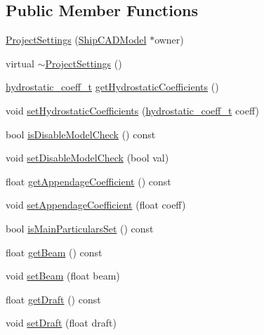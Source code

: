 \subsection*{Public Member Functions}
\begin{DoxyCompactItemize}
\item 
\hyperlink{classShipCAD_1_1ProjectSettings_a55001252531c21f4ccc89d8df9c6b184}{Project\+Settings} (\hyperlink{classShipCAD_1_1ShipCADModel}{Ship\+C\+A\+D\+Model} $\ast$owner)
\item 
virtual \hyperlink{classShipCAD_1_1ProjectSettings_a4c74ba587e58e538083072285937aa4c}{$\sim$\+Project\+Settings} ()
\item 
\hyperlink{namespaceShipCAD_a9cf77f0900561de9efc572dcbad4dbbd}{hydrostatic\+\_\+coeff\+\_\+t} \hyperlink{classShipCAD_1_1ProjectSettings_aef0458c7bfa6e484a155e78eca0d0202}{get\+Hydrostatic\+Coefficients} ()
\item 
void \hyperlink{classShipCAD_1_1ProjectSettings_ab729e778076b560d876f09955212256d}{set\+Hydrostatic\+Coefficients} (\hyperlink{namespaceShipCAD_a9cf77f0900561de9efc572dcbad4dbbd}{hydrostatic\+\_\+coeff\+\_\+t} coeff)
\item 
bool \hyperlink{classShipCAD_1_1ProjectSettings_abd8eb7eceeb01aa9ce69e1b0bf69fd23}{is\+Disable\+Model\+Check} () const 
\item 
void \hyperlink{classShipCAD_1_1ProjectSettings_ab9f9f88bba11a2093204affd18df17ab}{set\+Disable\+Model\+Check} (bool val)
\item 
float \hyperlink{classShipCAD_1_1ProjectSettings_a13b2f490e08d61b09a59d2d5008dba47}{get\+Appendage\+Coefficient} () const 
\item 
void \hyperlink{classShipCAD_1_1ProjectSettings_a31fdcc5990fb3c61161fe783b5ed4939}{set\+Appendage\+Coefficient} (float coeff)
\item 
bool \hyperlink{classShipCAD_1_1ProjectSettings_a023b0fc90ce3b5befdcbf01485f04bc6}{is\+Main\+Particulars\+Set} () const 
\item 
float \hyperlink{classShipCAD_1_1ProjectSettings_ad96c7b5dca9156a767dde327cf5b55c1}{get\+Beam} () const 
\item 
void \hyperlink{classShipCAD_1_1ProjectSettings_ac90d2a093ae0af951fd117d7f6981e92}{set\+Beam} (float beam)
\item 
float \hyperlink{classShipCAD_1_1ProjectSettings_a0fe6c2dde04c7172c334736516950b51}{get\+Draft} () const 
\item 
void \hyperlink{classShipCAD_1_1ProjectSettings_a16a64f2a4a9b6359ac46b0a85f90a4ae}{set\+Draft} (float draft)

\end{DoxyCompactItemize}
